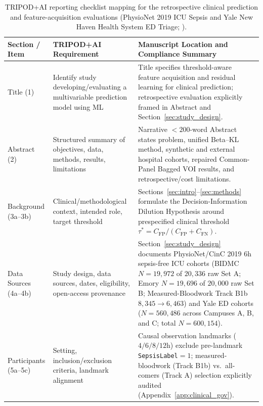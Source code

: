 \begin{table}[h!]
\centering
\caption{TRIPOD+AI reporting checklist mapping for the retrospective clinical prediction and feature-acquisition evaluations (PhysioNet 2019 ICU Sepsis and Yale New Haven Health System ED Triage; \citealp{collins2024tripodai}).}
\label{tab:tripod_ai}
\scriptsize
\renewcommand{\arraystretch}{1.12}
\begin{tabular}{>{\raggedright\arraybackslash}p{}>{\raggedright\arraybackslash}p{}>{\raggedright\arraybackslash}p{}}
\toprule
\textbf{Section / Item} & \textbf{TRIPOD+AI Requirement} & \textbf{Manuscript Location and Compliance Summary} \\
\midrule
Title (1) & Identify study developing/evaluating a multivariable prediction model using ML & Title specifies threshold-aware feature acquisition and residual learning for clinical prediction; retrospective evaluation explicitly framed in Abstract and Section~\ref{sec:study_design}. \\
Abstract (2) & Structured summary of objectives, data, methods, results, limitations & Narrative $<200$-word Abstract states problem, unified Beta--KL method, synthetic and external hospital cohorts, repaired Common-Panel Bagged VOI results, and retrospective/cost limitations. \\
Background (3a--3b) & Clinical/methodological context, intended role, target threshold & Sections~\ref{sec:intro}--\ref{sec:methods} formulate the Decision-Information Dilution Hypothesis around prespecified clinical threshold $\tau^* = C_{\text{FP}}/(C_{\text{FP}}+C_{\text{FN}})$. \\
Data Sources (4a--4b) & Study design, data sources, dates, eligibility, open-access provenance & Section~\ref{sec:study_design} documents PhysioNet/CinC 2019 $6\text{h}$ sepsis-free ICU cohorts (BIDMC $N=19{,}972$ of $20{,}336$ raw Set A; Emory $N=19{,}696$ of $20{,}000$ raw Set B; Measured-Bloodwork Track B1b $8{,}345 \to 6{,}463$) and Yale ED cohorts ($N=560{,}486$ across Campuses A, B, and C; total $N=600{,}154$). \\
Participants (5a--5c) & Setting, inclusion/exclusion criteria, landmark alignment & Causal observation landmarks ($4/6/8/12\text{h}$) exclude pre-landmark \texttt{SepsisLabel}$=1$; measured-bloodwork (Track B1b) vs.\ all-comers (Track A) selection explicitly audited (Appendix~\ref{app:clinical_gov}). \\

\end{tabular}
\end{table}
